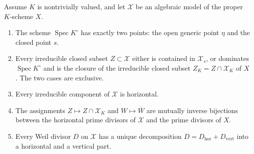 \begin{proposition}
\label{prop:vertical-horizontal}
Assume $K$ is nontrivially valued, and let $\mathcal X$ be an algebraic
model of the proper $K$-scheme $X$.
\begin{enumerate}
\item The scheme $\operatorname{Spec}K^\circ$ has exactly two points: the
  open generic point $\eta$ and the closed point $s$.
\item Every irreducible closed subset $Z\subset\mathcal X$ either is
  contained in $\mathcal X_s$, or dominates $\operatorname{Spec}K^\circ$ and
  is the closure of the irreducible closed subset
  $Z_K=Z\cap\mathcal X_K$ of $X$.  The two cases are exclusive.
\item Every irreducible component of $\mathcal X$ is horizontal.
\item The assignments $Z\mapsto Z\cap\mathcal X_K$ and
  $W\mapsto\overline W$ are mutually inverse bijections between the
  horizontal prime divisors of $\mathcal X$ and the prime divisors of $X$.
\item Every Weil divisor $D$ on $\mathcal X$ has a unique decomposition
  $D=D_{\mathrm{hor}}+D_{\mathrm{vert}}$ into a horizontal and a vertical
  part.
\end{enumerate}
\end{proposition}
